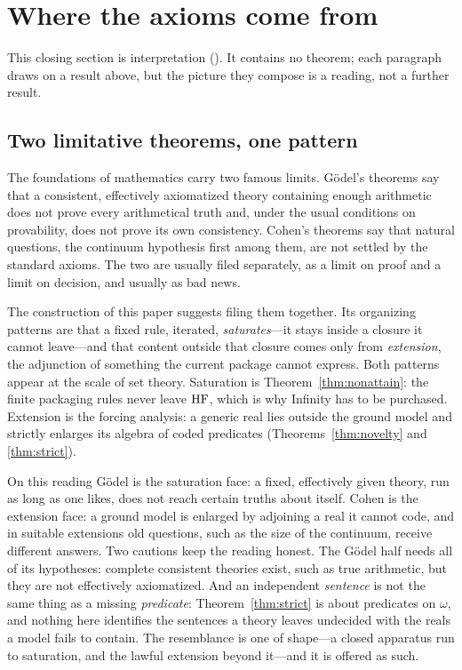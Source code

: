 \section{Where the axioms come from}\label{sec:discussion}

This closing section is interpretation (\metag). It contains no theorem; each paragraph draws on a
result above, but the picture they compose is a reading, not a further result.

\subsection{Two limitative theorems, one pattern}

The foundations of mathematics carry two famous limits. G\"odel's theorems \citep{Godel1931} say
that a consistent, effectively axiomatized theory containing enough arithmetic does not prove
every arithmetical truth and, under the usual conditions on provability, does not prove its own
consistency. Cohen's theorems \citep{Cohen1963} say that natural questions, the continuum
hypothesis first among them, are not settled by the standard axioms. The two are usually filed
separately, as a limit on proof and a limit on decision, and usually as bad news.

The construction of this paper suggests filing them together. Its organizing patterns are that a
fixed rule, iterated, \emph{saturates}---it stays inside a closure it cannot leave---and that
content outside that closure comes only from \emph{extension}, the adjunction of something the
current package cannot express. Both patterns appear at the scale of
set theory. Saturation is Theorem~\ref{thm:nonattain}: the finite packaging rules never leave
$\mathrm{HF}$, which is why Infinity has to be purchased. Extension is the forcing analysis: a generic real
lies outside the ground model and strictly enlarges its algebra of coded predicates
(Theorems~\ref{thm:novelty} and \ref{thm:strict}).

On this reading G\"odel is the saturation face: a fixed, effectively given theory, run as long as
one likes, does not reach certain truths about itself. Cohen is the extension face: a ground model
is enlarged by adjoining a real it cannot code, and in suitable extensions old questions, such as
the size of the continuum, receive different answers. Two cautions keep the reading honest. The
G\"odel half needs all of its hypotheses: complete consistent theories exist, such as true
arithmetic, but they are not effectively axiomatized. And an independent \emph{sentence} is not the
same thing as a missing \emph{predicate}: Theorem~\ref{thm:strict} is about predicates on $\omega$,
and nothing here identifies the sentences a theory leaves undecided with the reals a model fails to
contain. The resemblance is one of shape---a closed apparatus run to saturation, and the lawful
extension beyond it---and it is offered as such.


